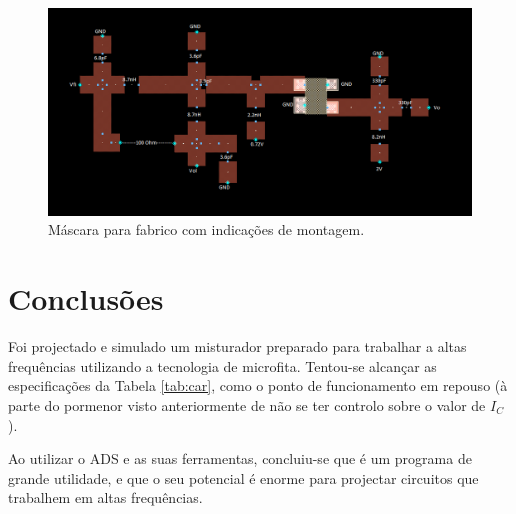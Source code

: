 \documentclass[11pt]{article}
\numberwithin{equation}{section}
\begin{document}
\begin{figure}[h]
	\centering
	\includegraphics[keepaspectratio=true, scale=0.45]{exps/layout_1}
	\vspace{-0.5em}
	\caption{Máscara para fabrico com indicações de montagem.}
	\vspace{-0.8em}
	\label{fig:layout_1}
\end{figure}

\section{Conclusões}

Foi projectado e simulado um misturador preparado para trabalhar a altas frequências utilizando a tecnologia de microfita. Tentou-se alcançar as especificações da Tabela \ref{tab:car}, como o ponto de funcionamento em repouso (à parte do pormenor visto anteriormente de não se ter controlo sobre o valor de $I_{C}$).

Ao utilizar o ADS e as suas ferramentas, concluiu-se que é um programa de grande utilidade, e que o seu potencial é enorme para projectar circuitos que trabalhem em altas frequências.
\end{document}
